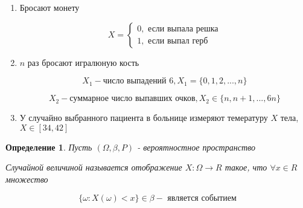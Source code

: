 \documentclass[a4paper, 14pt]{report}
\newtheorem{defenition}{Определение}[section]
\begin{document}
\begin{enumerate}
    \item Бросают монету

        $$
        X =
        \begin{cases}
            0, \text{ если выпала решка} \\
            1, \text{ если выпал герб}
        \end{cases}
        $$

    \item $n$ раз бросают игралюную кость

        $$
        X_1 - \text{число выпадений 6}, X_1 = \{0,1,2,...,n\}
        $$

        $$
        X_2 - \text{суммарное число выпавших очков}, X_2 \in \{n, n+1, ..., 6n\}
        $$

    \item У случайно выбранного пациента в больнице измеряют темературу $X$ тела, $X \in [34,42]$
\end{enumerate}

\begin{defenition}
    Пусть $(\Omega, \beta, P)$ - вероятностное пространство

    Случайной величиной называется отображение $X: \Omega \to R$ такое, что $\forall x \in R$ множество

    $$
    \{ \omega : X(\omega) < x \} \in \beta - \text{ является событием}
    $$
\end{defenition}
\end{document}
